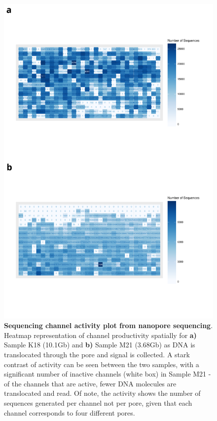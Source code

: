 \begin{figure}[htp]
	\begin{center}
		\includegraphics[page=1,scale = 0.45]{Figures/ONTWholeTranscriptome.pdf}
	\end{center}
	\captionsetup{width=0.95\textwidth}
	\caption[ONT Sequence Channel Activity from Whole Transcriptome Sequencing ]%
	{\textbf{Sequencing channel activity plot from nanopore sequencing}. Heatmap representation of channel productivity spatially for \textbf{a)} Sample K18 (10.1Gb) and \textbf{b)} Sample M21 (3.68Gb) as DNA is translocated through the pore and signal is collected. A stark contrast of activity can be seen between the two samples, with a significant number of inactive channels (white box) in Sample M21 - of the channels that are active, fewer DNA molecules are translocated and read.  Of note, the activity shows the number of sequences generated per channel not per pore, given that each channel corresponds to four different pores.}
	\label{fig:ont_seq_channel}
\end{figure}

